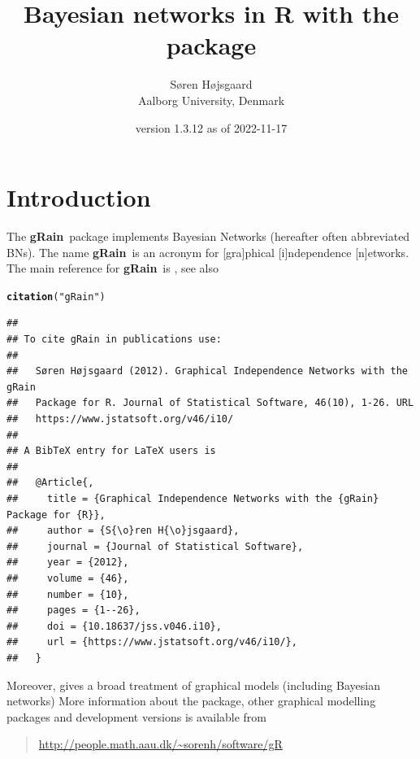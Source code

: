\documentclass[10pt]{article}\usepackage[]{graphicx}\usepackage[]{xcolor}
\author{S{\o}ren H{\o}jsgaard\\Aalborg University, Denmark}
\title{Bayesian networks in R with the \pkg{gRain} package}
\date{\pkg{gRain} version 1.3.12 as of 2022-11-17}
\makeatletter
\newcommand{\hlstr}[1]{\textcolor[rgb]{0.192,0.494,0.8}{#1}}%
\newcommand{\hlstd}[1]{\textcolor[rgb]{0.345,0.345,0.345}{#1}}%
\newcommand{\hlkwd}[1]{\textcolor[rgb]{0.737,0.353,0.396}{\textbf{#1}}}%
\newenvironment{kframe}{%
 \def\at@end@of@kframe{}%
 \ifinner\ifhmode%
  \def\at@end@of@kframe{\end{minipage}}%
  \begin{minipage}{\columnwidth}%
 \fi\fi%
 \def\FrameCommand##1{\hskip\@totalleftmargin \hskip-\fboxsep
 \colorbox{shadecolor}{##1}\hskip-\fboxsep
     \hskip-\linewidth \hskip-\@totalleftmargin \hskip\columnwidth}%
 \MakeFramed {\advance\hsize-\width
   \@totalleftmargin\z@ \linewidth\hsize
   \@setminipage}}%
 {\par\unskip\endMakeFramed%
 \at@end@of@kframe}
\newenvironment{knitrout}{}{} %
\def\grbn{{\bf gRain}}
\makeatother
\begin{document}
\maketitle
\tableofcontents
\parindent0pt\parskip5pt

\section{Introduction}

The \grbn\ package implements Bayesian Networks (hereafter often
abbreviated BNs). The name \grbn\ is an acronym for [gra]phical
[i]ndependence [n]etworks. The main reference for \grbn\  is
\cite{hoj:12}, see also

\begin{knitrout}
\color{fgcolor}\begin{kframe}
\begin{alltt}
\hlkwd{citation}\hlstd{(}\hlstr{"gRain"}\hlstd{)}
\end{alltt}
\begin{verbatim}
## 
## To cite gRain in publications use:
## 
##   Søren Højsgaard (2012). Graphical Independence Networks with the gRain
##   Package for R. Journal of Statistical Software, 46(10), 1-26. URL
##   https://www.jstatsoft.org/v46/i10/
## 
## A BibTeX entry for LaTeX users is
## 
##   @Article{,
##     title = {Graphical Independence Networks with the {gRain} Package for {R}},
##     author = {S{\o}ren H{\o}jsgaard},
##     journal = {Journal of Statistical Software},
##     year = {2012},
##     volume = {46},
##     number = {10},
##     pages = {1--26},
##     doi = {10.18637/jss.v046.i10},
##     url = {https://www.jstatsoft.org/v46/i10/},
##   }
\end{verbatim}
\end{kframe}
\end{knitrout}

Moreover, \cite{hoj:edw:lau:12} gives a broad treatment of graphical
models (including Bayesian networks) More information about the
package, other graphical modelling packages and development versions
is available from

\begin{quote}
\url{http://people.math.aau.dk/~sorenh/software/gR}
\end{quote}

\end{document}
